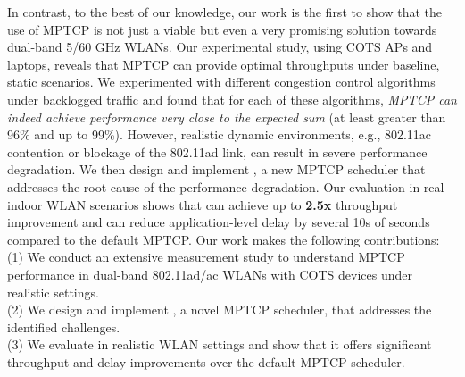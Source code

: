 In contrast, to the best of our knowledge, our work is the first to 
show that the use of MPTCP is not just a viable but even a very promising solution
towards dual-band 5/60 GHz WLANs. 
Our experimental study, using COTS APs and laptops, reveals that 
MPTCP can provide optimal throughputs under baseline, static scenarios.
We experimented with 
different congestion control algorithms 
under backlogged
traffic and found that for each of 
these
algorithms, \textit{MPTCP
can indeed achieve performance very close to the expected sum} (at
least greater than 96\% and up to 99\%).
However, realistic dynamic environments, e.g., 802.11ac contention or 
blockage of the 802.11ad link, 
can result in severe performance degradation. We then design and implement \name, a new
MPTCP scheduler that addresses the root-cause of the performance
degradation.
\fi
Our evaluation in real
indoor WLAN scenarios shows that \name can achieve up to \textbf{2.5x}
throughput improvement and can reduce application-level delay by several
10s of seconds compared to the default MPTCP.
\fi
Our work makes the following contributions:
\\
(1) We conduct an extensive measurement study to understand MPTCP
performance in dual-band 802.11ad/ac WLANs with COTS devices under
realistic settings.
\\
(2) We design and implement \name, a novel MPTCP scheduler, that
addresses the identified challenges.
\\
(3) We evaluate \name in realistic WLAN settings and show that it
offers significant throughput and delay improvements over the default
MPTCP scheduler.
\fi
